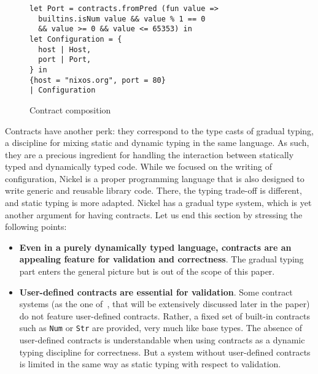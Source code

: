 \documentclass[sigplan,10pt,review,anonymous]{acmart}
\newcommand{\nickel}[1]{\lstinline[language=nickel]{#1}}
\begin{document}
\begin{figure}[h]
  \begin{center}
\begin{lstlisting}[language=nickel]
let Port = contracts.fromPred (fun value =>
  builtins.isNum value && value % 1 == 0
  && value >= 0 && value <= 65353) in
let Configuration = {
  host | Host,
  port | Port,
} in
{host = "nixos.org", port = 80}
| Configuration
\end{lstlisting}
  \end{center}
\caption{Contract composition}
\label{fig:contract-composition}
\end{figure}

Contracts have another perk: they correspond to the type casts of gradual
typing, a discipline for mixing static and dynamic typing in the same language.
As such, they are a precious ingredient for handling the interaction between 
statically typed and dynamically typed code. While we focused on the writing of
configuration, Nickel is a proper programming language that is also designed to
write generic and reusable library code. There, the typing trade-off is
different, and static typing is more adapted. Nickel has a gradual type system,
which is yet another argument for having contracts. Let us end this section by
stressing the following points:
\begin{itemize}
    \item \textbf{Even in a purely dynamically typed language, contracts are an
        appealing feature for validation and correctness}. The gradual typing
        part enters the general picture but is out of the scope of this paper.
    \item \textbf{User-defined contracts are essential for validation}. Some
        contract systems (as the one of~\cite{RootCauseOfBlame}, that will be
        extensively discussed later in the paper) do not feature user-defined
        contracts.  Rather, a fixed set of built-in contracts such as
        \nickel{Num} or \nickel{Str} are provided, very much like base
        types. The absence of user-defined contracts is understandable when
        using contracts as a dynamic typing discipline for correctness. But a
        system without user-defined contracts is limited in the same way as
        static typing with respect to validation.
\end{itemize}
\end{document}
